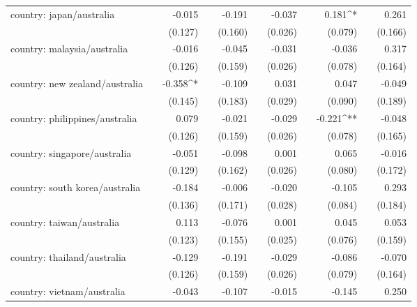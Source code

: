 \begin{tabular}{lcD{.}{.}{7}cD{.}{.}{7}cD{.}{.}{7}cD{.}{.}{7}cD{.}{.}{7}}
country: japan/australia           &  &  -0.015      &&  -0.191      &&  -0.037      &&  0.181^{*}   &&   0.261     \\
                                   &  &  (0.127)     &&  (0.160)     &&  (0.026)     &&  (0.079)     &&  (0.166)    \\
country: malaysia/australia        &  &  -0.016      &&  -0.045      &&  -0.031      &&  -0.036      &&   0.317     \\
                                   &  &  (0.126)     &&  (0.159)     &&  (0.026)     &&  (0.078)     &&  (0.164)    \\
country: new zealand/australia     &  & -0.358^{*}   &&  -0.109      &&   0.031      &&   0.047      &&  -0.049     \\
                                   &  &  (0.145)     &&  (0.183)     &&  (0.029)     &&  (0.090)     &&  (0.189)    \\
country: philippines/australia     &  &   0.079      &&  -0.021      &&  -0.029      && -0.221^{**}  &&  -0.048     \\
                                   &  &  (0.126)     &&  (0.159)     &&  (0.026)     &&  (0.078)     &&  (0.165)    \\
country: singapore/australia       &  &  -0.051      &&  -0.098      &&   0.001      &&   0.065      &&  -0.016     \\
                                   &  &  (0.129)     &&  (0.162)     &&  (0.026)     &&  (0.080)     &&  (0.172)    \\
country: south korea/australia     &  &  -0.184      &&  -0.006      &&  -0.020      &&  -0.105      &&   0.293     \\
                                   &  &  (0.136)     &&  (0.171)     &&  (0.028)     &&  (0.084)     &&  (0.184)    \\
country: taiwan/australia          &  &   0.113      &&  -0.076      &&   0.001      &&   0.045      &&   0.053     \\
                                   &  &  (0.123)     &&  (0.155)     &&  (0.025)     &&  (0.076)     &&  (0.159)    \\
country: thailand/australia        &  &  -0.129      &&  -0.191      &&  -0.029      &&  -0.086      &&  -0.070     \\
                                   &  &  (0.126)     &&  (0.159)     &&  (0.026)     &&  (0.079)     &&  (0.164)    \\
country: vietnam/australia         &  &  -0.043      &&  -0.107      &&  -0.015      &&  -0.145      &&   0.250     \\

\end{tabular}

